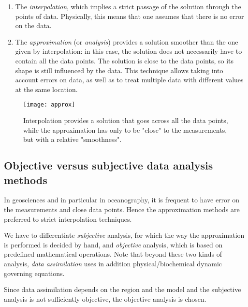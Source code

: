 \begin{enumerate}

\item The \textit{interpolation}, which implies a strict passage of the solution through the points of data. Physically, this means that one assumes that there is no error on the data. 


\item The \textit{approximation} (or \textit{analysis}) provides a solution smoother than the one given by interpolation: in this case, the solution does not necessarily have to contain all the data points. The solution is close to the data points, so its shape is still influenced by the data. This technique allows taking into account errors on data, as well as to treat multiple data with different values at the same location. 
\end{enumerate}

\begin{figure}[htpb]
	\centering
	\parbox{.5\textwidth}{
		\texttt{[image: approx]}
		}\parbox{.5\textwidth}{
		\caption{Interpolation provides a solution that goes across all the data points, while the approximation has only to be "close" to the measurements, but with a relative "smoothness".}
		}
\end{figure}


\subsection{Objective versus subjective data analysis methods\label{sec:gridding}}

In geosciences and in particular in oceanography, it is frequent to have error on the measurements and close data points. Hence the approximation methods are preferred to strict interpolation techniques.

We have to differentiate \textit{subjective} analysis, for which the way the approximation is performed is decided by hand, and \textit{objective} analysis, which is based on predefined mathematical operations. Note that beyond these two kinds of analysis, \textit{data assimilation} uses in addition physical/biochemical dynamic governing equations. 

Since data assimilation depends on the region and the model and the subjective analysis is not sufficiently objective, the objective analysis is chosen. 

